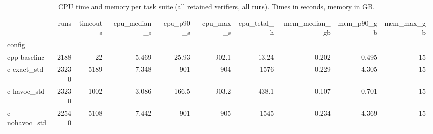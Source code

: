 \begin{table}[t]
  \centering
  \caption{CPU time and memory per task suite (all retained verifiers, all runs). Times in seconds, memory in GB.}
  \label{tab:perf-summary}
\begin{tabular}{lrrrrrrrrr}
\toprule
 & runs & timeouts & cpu\_median\_s & cpu\_p90\_s & cpu\_max\_s & cpu\_total\_h & mem\_median\_gb & mem\_p90\_gb & mem\_max\_gb \\
config &  &  &  &  &  &  &  &  &  \\
\midrule
cpp-baseline & 2188 & 22 & 5.469 & 25.93 & 902.1 & 13.24 & 0.202 & 0.495 & 15 \\
c-exact\_std & 23230 & 5189 & 7.348 & 901 & 904 & 1576 & 0.229 & 4.305 & 15 \\
c-havoc\_std & 23230 & 1002 & 3.086 & 166.5 & 903.2 & 438.1 & 0.107 & 0.701 & 15 \\
c-nohavoc\_std & 22540 & 5108 & 7.442 & 901 & 905 & 1545 & 0.234 & 4.369 & 15 \\
\bottomrule
\end{tabular}
\end{table}
